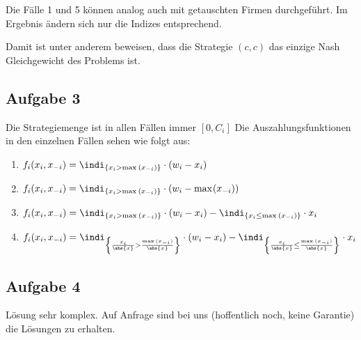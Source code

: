 Die Fälle 1 und 5 können analog auch mit getauschten Firmen durchgeführt. Im Ergebnis ändern sich nur die Indizes entsprechend. 

Damit ist unter anderem beweisen, dass die Strategie $(c, c)$ das einzige Nash Gleichgewicht des Problems ist.

\subsection{Aufgabe 3}
\label{sec:Aufgabe 3}

Die Strategiemenge ist in allen Fällen immer $[0,C_{i}]$
Die Auszahlungsfunktionen in den einzelnen Fällen sehen wie folgt aus:
\begin{enumerate}[label=\alph{enumi})]
	\item $f_{i}(x_{i}, x_{-i}) = \indi_{\{ x_{i} > \max_{}{(x_{-i})}\} } \cdot (w_{i} - x_{i})$
	\item $f_{i}(x_{i}, x_{-i}) = \indi_{\{ x_{i} > \max_{}{(x_{-i})}\} } \cdot (w_{i} - \max_{}(x_{-i}))$
	\item $f_{i}(x_{i}, x_{-i}) = \indi_{\{ x_{i} > \max_{}{(x_{-i})}\} } \cdot (w_{i} - x_{i})-\indi_{\{ x_{i} \leq \max_{}{(x_{-i})}\} }\cdot x_{i}$
	\item $f_{i}(x_{i}, x_{-i}) = \indi_{\left\{ \frac{x_{i}}{\abs{x} } > \frac{\max{(x_{-i})}}{\abs{x} }\right\} } \cdot (w_{i} - x_{i})-\indi_{\left\{ \frac{x_{i}}{\abs{x} } \leq \frac{\max_{}{(x_{-i})}}{\abs{x} }\right\} }\cdot x_{i}$
\end{enumerate}

\subsection{Aufgabe 4}
\label{sec:Aufgabe 4}
Lösung sehr komplex. Auf Anfrage sind bei uns (hoffentlich noch, keine Garantie) die Lösungen zu erhalten.

